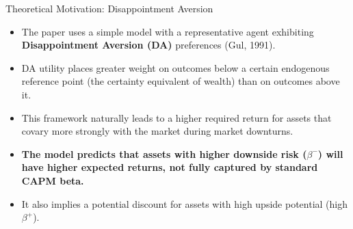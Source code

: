 \documentclass[10pt]{beamer}
\begin{document}
\begin{frame}{Theoretical Motivation: Disappointment Aversion}
    \begin{itemize}
        \item The paper uses a simple model with a representative agent exhibiting \textbf{Disappointment Aversion (DA)} preferences (Gul, 1991).
        \item DA utility places greater weight on outcomes below a certain endogenous reference point (the certainty equivalent of wealth) than on outcomes above it.
        \item This framework naturally leads to a higher required return for assets that covary more strongly with the market during market downturns.
        \item \textbf{The model predicts that assets with higher downside risk ($\beta^{-}$) will have higher expected returns, not fully captured by standard CAPM beta.}
        \item It also implies a potential discount for assets with high upside potential (high $\beta^{+}$).
    \end{itemize}
\end{frame}
\end{document}
